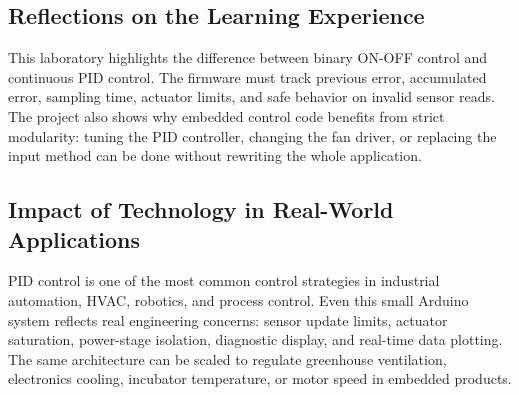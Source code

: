\subsection{Reflections on the Learning Experience}

This laboratory highlights the difference between binary ON-OFF control and continuous PID control. The firmware must track previous error, accumulated error, sampling time, actuator limits, and safe behavior on invalid sensor reads. The project also shows why embedded control code benefits from strict modularity: tuning the PID controller, changing the fan driver, or replacing the input method can be done without rewriting the whole application.

\subsection{Impact of Technology in Real-World Applications}

PID control is one of the most common control strategies in industrial automation, HVAC, robotics, and process control. Even this small Arduino system reflects real engineering concerns: sensor update limits, actuator saturation, power-stage isolation, diagnostic display, and real-time data plotting. The same architecture can be scaled to regulate greenhouse ventilation, electronics cooling, incubator temperature, or motor speed in embedded products.
